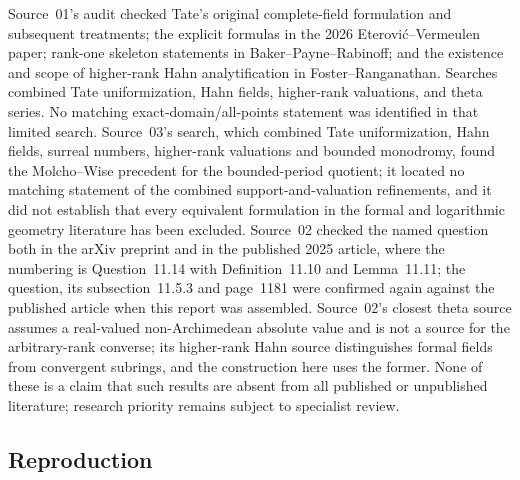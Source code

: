 \documentclass[11pt,letterpaper]{article}
\theoremstyle{definition}
\begin{document}
Source~01's audit checked Tate's original complete-field formulation and
subsequent treatments; the explicit formulas in the 2026
Eterovi\'c--Vermeulen paper; rank-one skeleton statements in
Baker--Payne--Rabinoff; and the existence and scope of higher-rank Hahn
analytification in Foster--Ranganathan. Searches combined Tate
uniformization, Hahn fields, higher-rank valuations, and theta series.
No matching exact-domain/all-points statement was identified in that
limited search. Source~03's search, which combined Tate uniformization, Hahn
fields, surreal numbers, higher-rank valuations and bounded monodromy,
found the Molcho--Wise precedent for the bounded-period quotient; it located
no matching statement of the combined support-and-valuation refinements,
and it did not establish that every equivalent formulation in the formal and
logarithmic geometry literature has been excluded. Source~02 checked the
named question both in the arXiv preprint and in the published 2025 article,
where the numbering is Question~11.14 with Definition~11.10 and
Lemma~11.11; the question, its subsection~11.5.3 and page~1181 were
confirmed again against the published article when this report was
assembled. Source~02's closest theta source assumes a real-valued
non-Archimedean absolute value and is not a source for the arbitrary-rank
converse; its higher-rank Hahn source distinguishes formal fields from
convergent subrings, and the construction here uses the former. None of
these is a claim that such results are absent from all published or
unpublished literature; research priority remains subject to specialist
review.

\subsection{Reproduction}\label{tate:app:reproduction}
\end{document}
